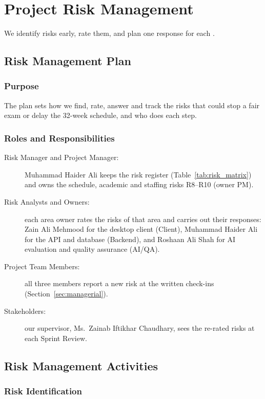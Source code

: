 \section{Project Risk Management}

We identify risks early, rate them, and plan one response for each \cite{risk1}.

\subsection{Risk Management Plan}

\subsubsection{Purpose}

The plan sets how we find, rate, answer and track the risks that could stop a fair exam or delay the 32-week schedule, and who does each step.

\subsubsection{Roles and Responsibilities}

\begin{description}
    \item[Risk Manager and Project Manager:] Muhammad Haider Ali keeps the risk register (Table~\ref{tab:risk_matrix}) and owns the schedule, academic and staffing risks R8--R10 (owner PM).
    \item[Risk Analysts and Owners:] each area owner rates the risks of that area and carries out their responses: Zain Ali Mehmood for the desktop client (Client), Muhammad Haider Ali for the API and database (Backend), and Roshaan Ali Shah for AI evaluation and quality assurance (AI/QA).
    \item[Project Team Members:] all three members report a new risk at the written check-ins (Section~\ref{sec:managerial}).
    \item[Stakeholders:] our supervisor, Ms.~Zainab Iftikhar Chaudhary, sees the re-rated risks at each Sprint Review.
\end{description}

\subsection{Risk Management Activities}

\subsubsection{Risk Identification}

